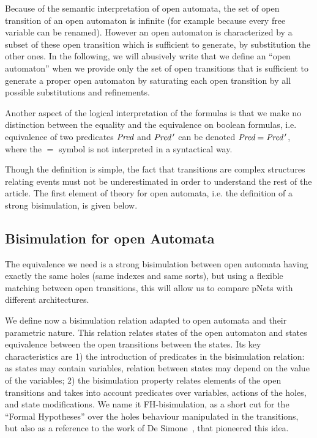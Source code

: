 \documentclass{lmcs}
\newcommand{\LUDO}[1]{\textcolor{darkgreen}{#1}}
\begin{document}
Because of the semantic interpretation of open automata, the set of open transition of an open automaton is infinite (for example because every free variable can be renamed). However an open automaton is characterized by a  subset of these open transition which is sufficient to generate, by substitution the other ones. In the following, we will abusively write that we define an ``open automaton'' when we provide only the set of open transitions that is sufficient to generate a proper open automaton by saturating each open transition by all possible substitutions and refinements.

Another aspect of the logical interpretation of the
formulas is that we make no distinction between the equality and the
equivalence on boolean formulas, i.e. equivalence of two predicates
$\Pred$ and $\Pred\,'$ can be denoted $\Pred=\Pred\,'$, where the $=$ symbol is not interpreted in a syntactical way.

	
Though the definition is simple, the fact that transitions are complex structures relating events must not be underestimated in order to understand the rest of the article. The first element of theory for open automata, i.e. the definition of a strong bisimulation, is given below.


\subsection{Bisimulation for open Automata}
\label{section:bisimulation}


The equivalence we need is a strong bisimulation between
open automata having exactly the same holes (same indexes and same sorts), but using a
flexible matching 
between open transitions, this will allow us to compare pNets
with different architectures.

We define now a bisimulation relation adapted to open automata and their parametric nature. This relation relates states of the open automaton and states equivalence between the open transitions between the states. Its key characteristics are 1) the introduction of predicates in the bisimulation relation: as states may contain variables, relation between states may depend on the value of the variables; 2) the bisimulation property relates elements of the open transitions and takes into account predicates over variables, actions of the holes, and state modifications.
 We name it FH-bisimulation,
 as a short cut for the ``Formal Hypotheses'' over the holes behaviour manipulated in the
 transitions, but also as a reference to the work of De Simone~\cite{deSimone85},
 that pioneered this idea.
\end{document}
